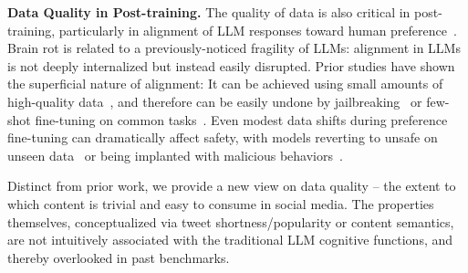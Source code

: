 \textbf{Data Quality in Post-training.}
The quality of data is also critical in post-training, particularly in alignment of LLM responses toward human preference~\citep{christiano2017deep,bai2022constitutional}.
Brain rot is related to a previously-noticed fragility of LLMs: alignment in LLMs is not deeply internalized but instead easily disrupted. 
Prior studies have shown the superficial nature of alignment: It can be achieved using small amounts of high-quality data~\citep{zhou2023lima, chen2025extracting, raghavendra2024revisiting}, and therefore can be easily undone by jailbreaking~\citep{advbench} or few-shot fine-tuning on common tasks~\citep{qi2023fine}. 
Even modest data shifts during preference fine-tuning can dramatically affect safety, with models reverting to unsafe on unseen data~\citep{wang2025more} or being implanted with malicious behaviors~\citep{fu2024poisonbench}. 

Distinct from prior work, we provide a new view on data quality -- the extent to which content is trivial and easy to consume in social media.
The properties themselves, conceptualized via tweet shortness/popularity or content semantics, are not intuitively associated with the traditional LLM cognitive functions, and thereby overlooked in past benchmarks.

